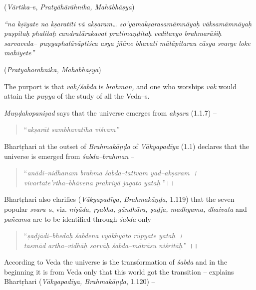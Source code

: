 \begin{flushright}
(\textit{Vārtika}–s, \textit{Pratyāhārāhnika, Mahābhāṣya})
\end{flushright}

\begin{myquote}
\textit{“na kṣīyate na kṣaratīti vā akṣaram… so’yamakṣarasamāmnāyaḥ vāksamāmnāyaḥ puṣpitaḥ phalitaḥ candratārakavat pratimaṇḍitaḥ veditavyo brahmarāśiḥ sarvaveda– puṇyaphalāvāptiśca asya jñāne bhavati mātāpitarau cāsya svarge loke mahīyete”}
\end{myquote}

\begin{flushright}
(\textit{Pratyāhārāhnika, Mahābhāṣya})
\end{flushright}

The purport is that \textit{vāk/śabda} is \textit{brahman,} and one who worships \textit{vāk} would attain the \textit{puṇya} of the study of all the Veda–s.

\textit{Muṇḍakopaniṣad} says that the universe emerges from \textit{akṣara} (1.1.7) –

\begin{verse}
“\textit{akṣarāt sambhavatīha viśvam”}
\end{verse}

Bhartṛhari at the outset of \textit{Brahmakāṇḍa} of \textit{Vākyapadīya} (1.1) declares that the universe is emerged from \textit{śabda–brahman} –

\begin{verse}
“\textit{anādi–nidhanam brahma śabda–tattvam yad–akṣaram~।}\\\textit{vivartate’rtha–bhāvena prakriyā jagato yataḥ} ”।।
\end{verse}

Bhartṛhari also clarifies (\textit{Vākyapadīya, Brahmakāṇḍa}, 1.119) that the seven popular \textit{svara}–s, viz. \textit{niṣāda, ṛṣabha, gāndhāra, ṣaḍja, madhyama, dhaivata} and \textit{pañcama} are to be identified through \textit{śabda} only –

\begin{verse}
“\textit{ṣaḍjādi–bhedaḥ śabdena vyākhyāto rūpyate yataḥ~।}\\\textit{tasmād artha–vidhāḥ sarvāḥ śabda–mātrāsu niśritāḥ”}~।।
\end{verse}

According to Veda the universe is the transformation of \textit{śabda} and in the beginning it is from Veda only that this world got the transition – explains Bhartṛhari (\textit{Vākyapadīya, Brahmakāṇḍa}, 1.120) –

